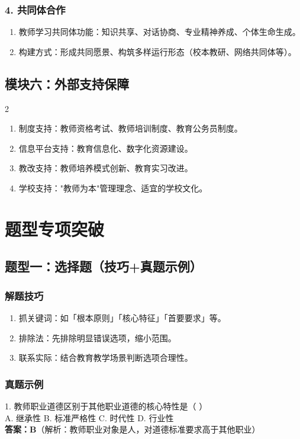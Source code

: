 \documentclass[12pt,a4paper]{article}
\begin{document}
\subsubsection{4. 共同体合作}
\begin{enumerate}[label=•,itemsep=0.5ex]
\item 教师学习共同体功能：知识共享、对话协商、专业精神养成、个体生命生成。
\item 构建方式：形成共同愿景、构筑多样运行形态（校本教研、网络共同体等）。
\end{enumerate}

\subsection{模块六：外部支持保障}
\begin{multicols}{2}
\begin{enumerate}[label=•,itemsep=0.5ex]
\item 制度支持：教师资格考试、教师培训制度、教育公务员制度。
\item 信息平台支持：教育信息化、数字化资源建设。
\item 教改支持：教师培养模式创新、教育实习改进。
\item 学校支持："教师为本"管理理念、适宜的学校文化。
\end{enumerate}
\end{multicols}

\newpage

\section{题型专项突破}
\subsection{题型一：选择题（技巧+真题示例）}
\subsubsection{解题技巧}
\begin{enumerate}[label=•,itemsep=0.3ex]
\item 抓关键词：如「根本原则」「核心特征」「首要要求」等。
\item 排除法：先排除明显错误选项，缩小范围。
\item 联系实际：结合教育教学场景判断选项合理性。
\end{enumerate}

\subsubsection{真题示例}
1. 教师职业道德区别于其他职业道德的核心特性是（ ）\\
A. 继承性 B. 标准严格性 C. 时代性 D. 行业性\\
\textbf{答案：B}（解析：教师职业对象是人，对道德标准要求高于其他职业）
\end{document}
